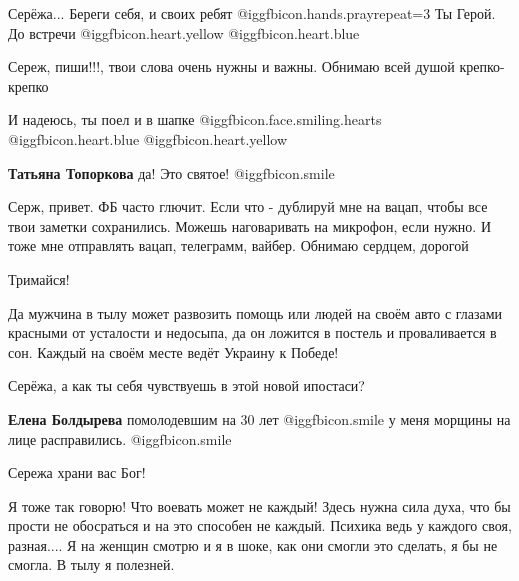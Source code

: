  
 
 
 
 
\zzSecCmt

\begin{itemize} %

Серёжа...
Береги себя, и своих ребят  @igg{fbicon.hands.pray}{repeat=3} 
Ты Герой.
До встречи  @igg{fbicon.heart.yellow}  @igg{fbicon.heart.blue} 


Сереж, пиши!!!, твои слова очень нужны и важны. Обнимаю всей душой крепко-крепко


И надеюсь, ты поел и в шапке @igg{fbicon.face.smiling.hearts}
@igg{fbicon.heart.blue}  @igg{fbicon.heart.yellow} 

\textbf{Татьяна Топоркова} да! Это святое!  @igg{fbicon.smile} 


Серж, привет. ФБ часто глючит. Если что - дублируй мне на вацап, чтобы все твои
заметки сохранились. Можешь наговаривать на микрофон, если нужно. И тоже мне
отправлять вацап, телеграмм, вайбер. Обнимаю сердцем, дорогой

Тримайся!


Да мужчина в тылу может развозить помощь или людей на своём авто с глазами
красными от усталости и недосыпа, да он ложится в постель и проваливается в
сон. Каждый на своём месте ведёт Украину к Победе!

Серёжа, а как ты себя чувствуешь в этой новой ипостаси?

\textbf{Елена Болдырева} помолодевшим на 30 лет  @igg{fbicon.smile}  у меня морщины на лице расправились.  @igg{fbicon.smile} 


Сережа храни вас Бог!

Я тоже так говорю! Что воевать может не каждый! Здесь нужна сила духа, что бы
прости не обосраться и на это способен не каждый. Психика ведь у каждого своя,
разная.... Я на женщин смотрю и я в шоке, как они смогли это сделать, я бы не
смогла. В тылу я полезней.


\end{itemize}
